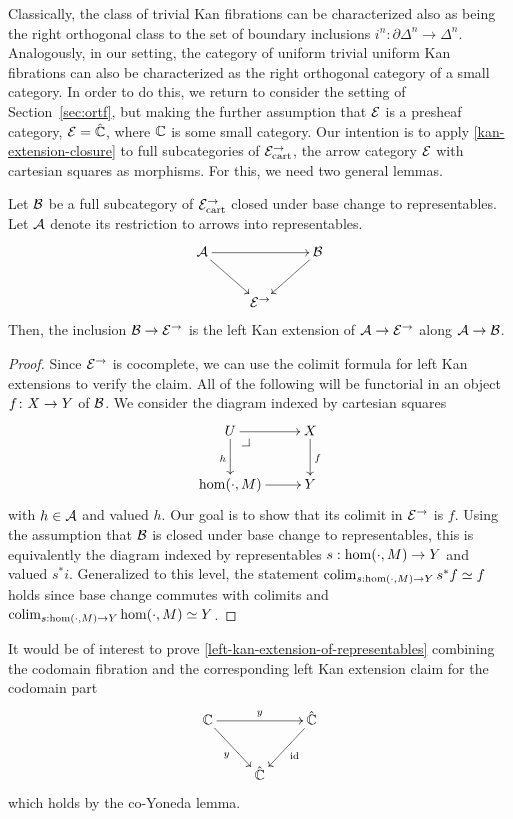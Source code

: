 \documentclass[reqno,10pt,a4paper,oneside]{amsart}
\begin{document}
 Classically, the class of trivial Kan fibrations can be characterized also as being the right orthogonal class to the
set of boundary inclusions $i^n : \partial \Delta^n \to \Delta^n$. Analogously, in our setting, the category of uniform trivial uniform
Kan fibrations can also be characterized as the right orthogonal category of  a small category.
In order to do this, we return to consider the setting of Section~\ref{sec:ortf}, but making the
further assumption that $\catE$ is a presheaf category, \ie $\catE = \hat{\cat{C}}$, where $\catC$ is some small category. Our intention is to apply \cref{kan-extension-closure} to full subcategories of $\catE_{\cart}^{\to}$, the arrow category $\catE$ with cartesian squares as morphisms. For this, we need two general lemmas.

\begin{lemma}
\label{left-kan-extension-of-representables}
Let $\cal{B}$ be a full subcategory of $\catE_{\cart}^{\to}$ closed under base change to representables.
Let $\cal{A}$ denote its restriction to arrows into representables.
\[
\xymatrix{
  \cal{A}
  \ar[rr]
  \ar[dr]
&&
  \cal{B}
  \ar[dl]
\\&
  \catE^{\to}
}
\]
Then, the inclusion $\cal{B} \to \catE^{\to}$ is the left Kan extension of $\cal{A} \to \catE^{\to}$ along $\cal{A} \to \cal{B}$.
\end{lemma}


\begin{proof}
Since $\catE^{\to}$ is cocomplete, we can use the colimit formula for left Kan extensions to verify the claim.
All of the following will be functorial in an object $f \co X \to Y$ of $\cal{B}$.
We consider the diagram indexed by cartesian squares
\[
\xymatrix{
  U
  \ar[r]
  \ar[d]_{h}
  \pullback{dr}
&
  X
  \ar[d]^{f}
\\
  \hom(\arghole, M)
  \ar[r]
&
  Y
}
\]
with $h \in \cal{A}$ and valued $h$.
Our goal is to show that its colimit in $\catE^{\to}$ is $f$.
Using the assumption that $\cal{B}$ is closed under base change to representables, this is equivalently the diagram indexed by representables $s : \hom(\arghole, M) \to Y$ and valued $s^* i$.
Generalized to this level, the statement $\colim_{s : \hom(\arghole, M) \to Y} s^* f \simeq f$ holds since base change commutes with colimits and 
$\colim_{s : \hom(\arghole, M) \to Y} \hom(\arghole, M) \simeq Y$.
\end{proof}


\begin{remark} It would be of interest to prove \cref{left-kan-extension-of-representables} combining 
the codomain fibration and the corresponding left Kan extension claim for the codomain part
\[
\xymatrix{
  \cat{C}
  \ar[rr]^{y}
  \ar[dr]_{y}
&&
  \hat{\catC}
  \ar[dl]^{\id}
\\&
  \hat{\cat{C}}
}
\]
which holds by the co-Yoneda lemma.
\end{remark}
\end{document}
